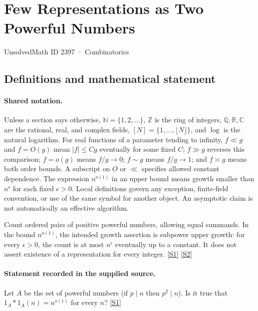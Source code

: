 \documentclass[11pt,a4paper]{article}
\newcommand{\N}{\mathbb{N}}
\newcommand{\Z}{\mathbb{Z}}
\newcommand{\Q}{\mathbb{Q}}
\newcommand{\R}{\mathbb{R}}
\newcommand{\C}{\mathbb{C}}
\newcommand{\sref}[2]{\hyperlink{source:#1:#2}{[S#2]}}
\begin{document}

\setcounter{section}{2396}

\section{Few Representations as Two Powerful Numbers}\label{2397}

{\small\sffamily UnsolvedMath ID 2397 · Combinatorics}

\subsection{Definitions and mathematical statement}

\paragraph{Shared notation.}Unless a section says otherwise, $\N=\{1,2,\ldots\}$,
$\Z$ is the ring of integers, $\Q,\R,\C$ are the rational, real, and complex
fields, $[N]=\{1,\ldots,\lfloor N\rfloor\}$, and $\log$ is the natural
logarithm. For real functions of a parameter tending to infinity,
$f\ll g$ and $f=O(g)$ mean $|f|\leq Cg$ eventually for some fixed $C$;
$f\gg g$ reverses this comparison; $f=o(g)$ means $f/g\to0$;
$f\sim g$ means $f/g\to1$; and $f\asymp g$ means both order bounds.
A subscript on $O$ or $\ll$ specifies allowed constant dependence.
The expression $n^{o(1)}$ in an upper bound means growth smaller than
$n^\epsilon$ for each fixed $\epsilon>0$. Local definitions govern any
exception, finite-field convention, or use of the same symbol for another
object. An asymptotic claim is not automatically an effective algorithm.



Count ordered pairs of positive powerful numbers, allowing equal summands. In the bound $n^{o(1)}$, the intended growth assertion is subpower upper growth: for every $\epsilon>0$, the count is at most $n^\epsilon$ eventually up to a constant. It does not assert existence of a representation for every integer. \sref{2397}{1} \sref{2397}{2}

\paragraph{Statement recorded in the supplied source.}
Let $A$ be the set of powerful numbers (if $p\mid n$ then $p^2\mid n$). Is it true that $ 1_A\ast 1_A(n)=n^{o(1)} $ for every $n$? \sref{2397}{1}
\end{document}
